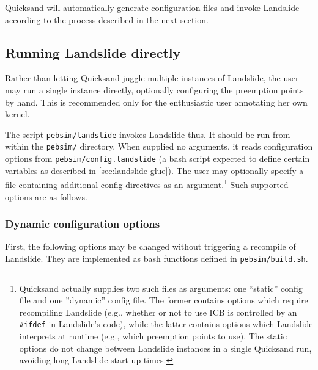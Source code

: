 Quicksand will automatically generate configuration files and invoke Landslide according to the process described in the next section.


\subsection{Running Landslide directly}
\label{sec:landslide-directly}

Rather than letting Quicksand juggle multiple instances of Landslide,
the user may run a single instance directly, optionally configuring the preemption points by hand.
This is recommended only for the enthusiastic user annotating her own kernel.

The script {\tt pebsim/landslide} invokes Landslide thus.
It should be run from within the {\tt pebsim/} directory.
When supplied no arguments, it reads configuration options from {\tt pebsim/config.landslide}
(a bash script expected to define certain variables as described in \cref{sec:landslide-glue}).
The user may optionally specify a file containing additional config directives
as an argument.\footnote{
Quicksand actually supplies two such files as arguments: one ``static'' config file and one ''dynamic'' config file.
The former contains options which require recompiling Landslide (e.g., whether or not to use ICB is controlled by an {\tt \#ifdef} in Landslide's code),
while the latter contains options which Landslide interprets at runtime (e.g., which preemption points to use).
The static options do not change between Landslide instances in a single Quicksand run,
avoiding long Landslide start-up times.
}
Such supported options are as follows.

\subsubsection{Dynamic configuration options}
\label{sec:landslide-dynamicconfig}

First, the following options may be changed without triggering a recompile of Landslide.
They are implemented as bash functions defined in {\tt pebsim/build.sh}.

